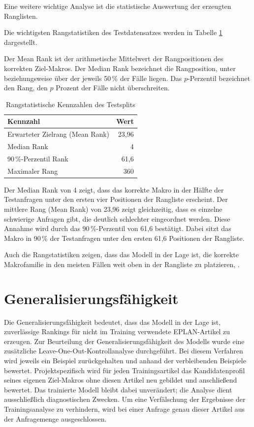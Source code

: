 Eine weitere wichtige Analyse ist die statistische Auswertung der erzeugten Ranglisten.


Die wichtigsten Rangstatistiken des Testdatensatzes werden in Tabelle \ref{tab:rangstatistik} dargestellt.

Der Mean Rank ist der arithmetische Mittelwert der Rangpositionen des korrekten Ziel-Makros. Der Median Rank bezeichnet die Rangposition, unter beziehungsweise über der jeweils 50\,\% der Fälle liegen. Das $p$-Perzentil bezeichnet den Rang, den $p$ Prozent der Fälle nicht überschreiten.

\begin{table}[H] 
  \centering 
  \caption{Rangstatistische Kennzahlen des Testsplits} 
  \label{tab:rangstatistik} 
  \begin{tabular}{lr} 
    \toprule 
    \textbf{Kennzahl} & \textbf{Wert} \\ 
    \midrule 
    Erwarteter Zielrang (Mean Rank) & 23,96 \\
    Median Rank & 4 \\
    90\,\%-Perzentil Rank & 61,6 \\
    Maximaler Rang & 360 \\
    \bottomrule 
  \end{tabular} 
\end{table}

Der Median Rank von 4 zeigt, dass das korrekte Makro \parencite{EPLAN-Makros} in der Hälfte der Testanfragen unter den ersten vier Positionen der Rangliste erscheint.
Der mittlere Rang (Mean Rank) von 23,96 zeigt gleichzeitig, dass es einzelne schwierige Anfragen gibt, die deutlich schlechter eingeordnet werden.
Diese Annahme wird durch das 90\,\%-Perzentil von 61,6 bestätigt. Dabei sitzt das Makro \parencite{EPLAN-Makros} in 90\,\% der Testanfragen unter den ersten 61,6 Positionen der Rangliste.

Auch die Rangstatistiken zeigen, dass das Modell in der Lage ist, die korrekte Makrofamilie in den meisten Fällen weit oben in der Rangliste zu platzieren, \parencite{LTR_Configuration_Test_Series}.

\section{Generalisierungsfähigkeit}

Die Generalisierungsfähigkeit bedeutet, dass das Modell in der Lage ist, zuverlässige Rankings für nicht im Training verwendete EPLAN-Artikel zu erzeugen.
Zur Beurteilung der Generalisierungsfähigkeit des Modells wurde eine zusätzliche Leave-One-Out-Kontrollanalyse durchgeführt. Bei diesem Verfahren wird jeweils ein Beispiel zurückgehalten und anhand der verbleibenden Beispiele bewertet. Projektspezifisch wird für jeden Trainingsartikel das Kandidatenprofil seines eigenen Ziel-Makros ohne diesen Artikel neu gebildet und anschließend bewertet. Das trainierte Modell bleibt dabei unverändert; die Analyse dient ausschließlich diagnostischen Zwecken. Um eine Verfälschung der Ergebnisse der Trainingsanalyse zu verhindern, wird bei einer Anfrage genau dieser Artikel aus der Anfragemenge ausgeschlossen.



